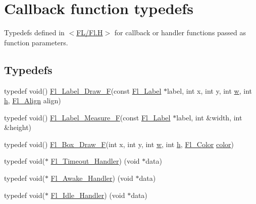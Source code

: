 \hypertarget{group__callback__functions}{}\section{Callback function typedefs}
\label{group__callback__functions}


Typedefs defined in $<$\hyperlink{_fl_8_h}{F\+L/\+Fl.\+H}$>$ for callback or handler functions passed as function parameters.  


\subsection*{Typedefs}
\begin{DoxyCompactItemize}
\item 
typedef void() \hyperlink{group__callback__functions_ga569530b250a4e2f56022249512687a0c}{Fl\+\_\+\+Label\+\_\+\+Draw\+\_\+F}(const \hyperlink{struct_fl___label}{Fl\+\_\+\+Label} $\ast$label, int x, int y, int \hyperlink{forms_8_h_aac374e320caaadeca4874add33b62af2}{w}, int \hyperlink{forms_8_h_a7e427ba5b307f9068129699250690066}{h}, \hyperlink{_enumerations_8_h_a44e8bcd1e030e65e4f88cbae64a7c3e3}{Fl\+\_\+\+Align} align)
\item 
typedef void() \hyperlink{group__callback__functions_ga946140c0dcd42dbef9f134af6f2da17b}{Fl\+\_\+\+Label\+\_\+\+Measure\+\_\+F}(const \hyperlink{struct_fl___label}{Fl\+\_\+\+Label} $\ast$label, int \&width, int \&height)
\item 
typedef void() \hyperlink{group__callback__functions_gacb24a62f521a0e02cd7872a3bfbf3855}{Fl\+\_\+\+Box\+\_\+\+Draw\+\_\+F}(int x, int y, int \hyperlink{forms_8_h_aac374e320caaadeca4874add33b62af2}{w}, int \hyperlink{forms_8_h_a7e427ba5b307f9068129699250690066}{h}, \hyperlink{_enumerations_8_h_a8b762953646f8abee866061f1af78a6a}{Fl\+\_\+\+Color} \hyperlink{gl2opengl_8h_a321f1e32cd01131a4f0e10f60a8fcc13}{color})
\item 
typedef void($\ast$ \hyperlink{group__callback__functions_ga17b5c6570394124287997166a50ff07a}{Fl\+\_\+\+Timeout\+\_\+\+Handler}) (void $\ast$data)
\item 
typedef void($\ast$ \hyperlink{group__callback__functions_ga28b44ff2052ca0b06d0da852fadd42c0}{Fl\+\_\+\+Awake\+\_\+\+Handler}) (void $\ast$data)
\item 
typedef void($\ast$ \hyperlink{group__callback__functions_gac9d2aab1d3142308450e2da09716013e}{Fl\+\_\+\+Idle\+\_\+\+Handler}) (void $\ast$data)
\item 

\end{DoxyCompactItemize}
